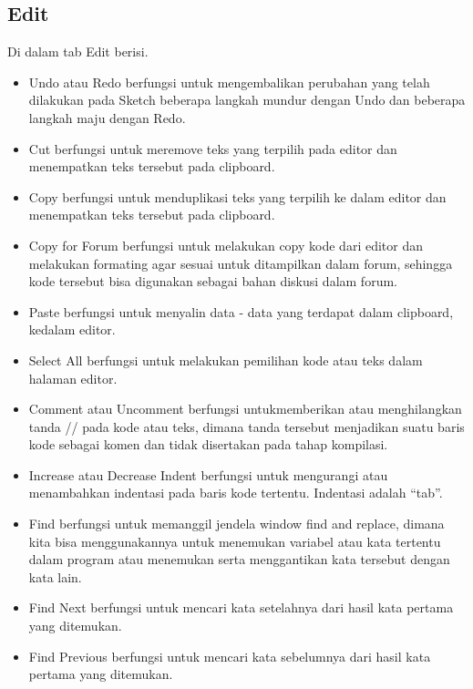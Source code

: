 \subsection{Edit}
Di dalam tab Edit berisi.
\begin{itemize}
\item Undo atau Redo berfungsi untuk mengembalikan perubahan yang telah dilakukan pada Sketch beberapa langkah mundur dengan Undo dan beberapa langkah maju dengan Redo.
\item Cut berfungsi untuk meremove teks yang terpilih pada editor dan menempatkan teks tersebut pada clipboard.
\item Copy berfungsi untuk menduplikasi teks yang terpilih ke dalam editor dan menempatkan teks tersebut pada clipboard.









\item Copy for Forum berfungsi untuk melakukan copy kode dari editor dan melakukan formating agar sesuai untuk ditampilkan dalam forum, sehingga kode tersebut bisa digunakan sebagai bahan diskusi dalam forum.
\item Paste berfungsi untuk menyalin data - data yang terdapat dalam clipboard, kedalam editor.
\item Select All berfungsi untuk melakukan pemilihan kode atau teks dalam halaman editor.
\item Comment atau Uncomment berfungsi untukmemberikan atau menghilangkan tanda // pada kode atau teks, dimana tanda tersebut menjadikan suatu baris kode sebagai komen dan tidak disertakan pada tahap kompilasi.
\item Increase atau Decrease Indent berfungsi untuk mengurangi atau menambahkan indentasi pada baris kode tertentu. Indentasi adalah “tab”.
\item Find berfungsi untuk memanggil jendela window find and replace, dimana kita bisa menggunakannya untuk menemukan variabel atau kata tertentu dalam program atau menemukan serta menggantikan kata tersebut dengan kata lain.
\item Find Next berfungsi untuk mencari kata setelahnya dari hasil kata pertama yang ditemukan.
\item Find Previous berfungsi untuk mencari kata sebelumnya dari hasil kata pertama yang ditemukan.
\end{itemize} 

